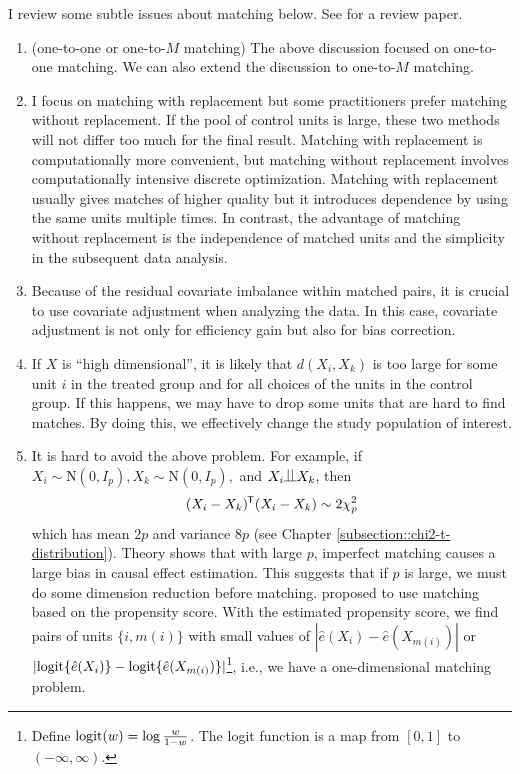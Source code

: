 I review some subtle issues about matching below. See \citet{stuart2010matching} for a review paper. 
\begin{enumerate}
\item
(one-to-one or one-to-$M$ matching)
The above discussion focused on one-to-one matching. We can also extend the discussion to one-to-$M$ matching.


\item
I focus on matching with replacement but some practitioners prefer matching without replacement. If the pool of control units is large, these two methods will not differ too much for the final result. Matching with replacement is computationally more convenient, but matching without replacement involves computationally intensive discrete optimization. Matching with replacement usually gives matches of higher quality but it introduces dependence by using the same units multiple times. In contrast, the advantage of matching without replacement is the independence of matched units and the simplicity in the subsequent data analysis. 


\item
Because of the residual covariate imbalance within matched pairs, it is crucial to use covariate adjustment when analyzing the data. In this case, covariate adjustment is not only for efficiency gain but also for bias correction.

\item
If $X$ is ``high dimensional'', it is likely that $d(X_i ,X_k)$ is too large for some unit $i$ in the treated group and for all choices of the units in the control group. If this happens, we may have to drop some units that are hard to find matches. By doing this, we effectively change the study population of interest.  


\item
It is hard to avoid the above problem. For example, if $X_i \sim \text{N}(0, I_p), X_k \sim\text{N}(0, I_p) ,$ and $X_i \ind X_k$, then 
$$
(X_i - X_k)^{\mkern-1.5mu\mathsf{T}} (X_i - X_k) \sim    2 \chi^2_p
$$ 
which has mean $2p$ and variance $8p$ (see Chapter \ref{subsection::chi2-t-distribution}). 
Theory shows that with large $p$, imperfect matching causes a large bias in causal effect estimation. 
This suggests that if $p$ is large,  we must do some dimension reduction before matching. 
\citet{rosenbaum1983central} proposed to use matching based on the propensity score. With the estimated propensity score, we find pairs of units $\{ i, m(i)\}$ with small values of $ |  \hat{e}(X_i) -  \hat{e}(X_{m(i)})  |$ or $| \textup{logit}\{ \hat{e}(X_i)\} - \textup{logit}\{ \hat{e}(X_{m(i)}) \} | $\footnote{Define $\textup{logit}(w) = \log \frac{w}{1-w}$. The logit function is a map from $[0,1]$ to $(-\infty, \infty)$.}, i.e., we have a one-dimensional matching problem. 
\end{enumerate}

